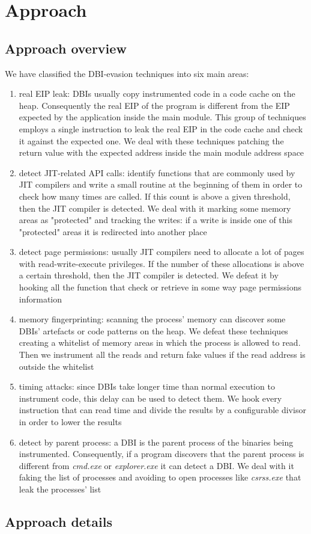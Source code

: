\chapter{Approach}
\label{chapter3}
\thispagestyle{empty}

\section{Approach overview}
We have classified the DBI-evasion techniques into six main areas:
\begin{enumerate}
\item real EIP leak: DBIs usually copy instrumented code in a code cache on the heap. Consequently the real EIP of the program is different from the EIP expected by the application inside the main module. This group of techniques employs a single instruction to leak the real EIP in the code cache and check it against the expected one. We deal with these techniques patching the return value with the expected address inside the main module address space
\item detect JIT-related API calls: identify functions that are commonly used by JIT compilers and write a small routine at the beginning of them in order to check how many times are called. If this count is above a given threshold, then the JIT compiler is detected. We deal with it marking some memory areas as "protected" and tracking the writes: if a write is inside one of this "protected" areas it is redirected into another place
\item detect page permissions: usually JIT compilers need to allocate a lot of pages with read-write-execute privileges. If the number of these allocations is above a certain threshold, then the JIT compiler is detected. We defeat it by hooking all the function that check or retrieve in some way page permissions information
\item memory fingerprinting: scanning the process' memory can discover some DBIs' artefacts or code patterns on the heap. We defeat these techniques creating a whitelist of memory areas in which the process is allowed to read. Then we instrument all the reads and return fake values if the read address is outside the whitelist
\item timing attacks: since DBIs take longer time than normal execution to instrument code, this delay can be used to detect them. We hook every instruction that can read time and divide the results by a configurable divisor in order to lower the results
\item detect by parent process: a DBI is the parent process of the binaries being instrumented. Consequently, if a program discovers that the parent process is different from \textit{cmd.exe} or \textit{explorer.exe} it can detect a DBI. We deal with it faking the list of processes and avoiding to open processes like \textit{csrss.exe} that leak the processes' list
\end{enumerate}
\section{Approach details}

